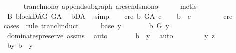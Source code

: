 \begin{isabellebody}
\ \ \ \ \isamarkupfalse%
\ trancl{\isacharunderscore}{\kern0pt}mono\ append{\isacharunderscore}{\kern0pt}subgraph\ arcs{\isacharunderscore}{\kern0pt}ends{\isacharunderscore}{\kern0pt}mono\isanewline
\ \ \ \ \isamarkupfalse%
\ {\isacharparenleft}{\kern0pt}metis{\isacharparenright}{\kern0pt}\ \ \isanewline
{}\isamarkupfalse%
\ \isanewline
\ \ \isamarkupfalse%
\ B{}{\isacharcolon}{\kern0pt}\ blockDAG\ {\isachardoublequoteopen}G{\isacharunderscore}{\kern0pt}A{\isachardoublequoteclose}\ \isamarkupfalse%
\ bD{\isacharunderscore}{\kern0pt}A\ \isamarkupfalse%
\ simp\isanewline
\ \ \isamarkupfalse%
\ c{\isacharunderscore}{\kern0pt}re{\isacharcolon}{\kern0pt}\ {\isachardoublequoteopen}b\ {\isasymrightarrow}\isactrlsup {\isacharplus}{\kern0pt}\isactrlbsub G{\isacharunderscore}{\kern0pt}A\isactrlesub \ c{\isachardoublequoteclose}\isanewline
\ \ \isamarkupfalse%
\ {\isachardoublequoteopen}b\ {\isasymrightarrow}\isactrlsup {\isacharplus}{\kern0pt}\ c{\isachardoublequoteclose}\ \ \ \isanewline
\ \ \ \ \isamarkupfalse%
\ c{\isacharunderscore}{\kern0pt}re\isanewline
\ \ \isamarkupfalse%
{\isacharparenleft}{\kern0pt}cases\ \ rule{\isacharcolon}{\kern0pt}\ trancl{\isacharunderscore}{\kern0pt}induct{\isacharparenright}{\kern0pt}\isanewline
\ \ \ \ \isamarkupfalse%
\ {\isacharparenleft}{\kern0pt}base\ y{\isacharparenright}{\kern0pt}\isanewline
\ \ \ \ \isamarkupfalse%
\ \isamarkupfalse%
\ {\isachardoublequoteopen}b\ {\isasymrightarrow}\isactrlbsub G\isactrlesub \ y{\isachardoublequoteclose}\ \isamarkupfalse%
\ dominates{\isacharunderscore}{\kern0pt}preserve\ assms{\isacharparenleft}{\kern0pt}{}{\isacharparenright}{\kern0pt}\ \isamarkupfalse%
\ auto\isanewline
\ \ \ \ \isamarkupfalse%
\ \isamarkupfalse%
\ {\isachardoublequoteopen}b\ {\isasymrightarrow}\isactrlsup {\isacharplus}{\kern0pt}\ y{\isachardoublequoteclose}\ \isamarkupfalse%
\ auto\isanewline
\ \ \isamarkupfalse%
\isanewline
\ \ \ \ \isamarkupfalse%
\ y\ z\ \ \ \ \isanewline
\ \ \ \ \isamarkupfalse%
\ b{\isacharunderscore}{\kern0pt}y{\isacharcolon}{\kern0pt}\ {\isachardoublequoteopen}b\ {\isasymrightarrow}\isactrlsup {\isacharplus}{\kern0pt}\ y{\isachardoublequoteclose}\ \isanewline
\ \ \ \ \isamarkupfalse%
\ \isamarkupfalse%

\end{isabellebody}
